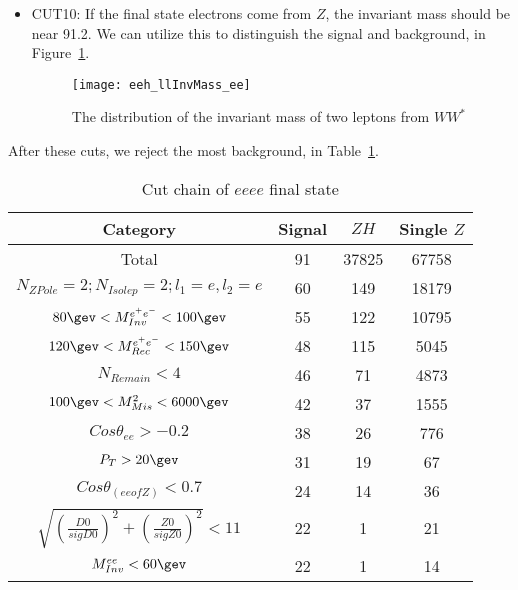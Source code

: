 \documentclass[11pt,a4paper]{cepcnote}
\begin{document}
\begin{itemize}
\item CUT10: If the final state electrons come from $Z$, the invariant mass should be near 91.2\gev.
We can utilize this to distinguish the signal and background, in Figure~\ref{fig:llInvMass}.
\begin{figure}[H]
\centering
\texttt{[image: eeh\_llInvMass\_ee]}
\caption[Invariant Mass of two electrons]{The distribution of the invariant mass of two leptons from $WW^*$}
\label{fig:llInvMass}
\end{figure}

\end{itemize}

After these cuts, we reject the most background, in Table~\ref{tab:eeCutchain}.
\begin{table}[H]
  \begin{center}
    \begin{tabular}{cccc}
      \hline \hline
      \multicolumn{1}{c}{Category}      & \multicolumn{1}{c}{Signal}&\multicolumn{1}{c}{$ZH$}&\multicolumn{1}{c}{Single $Z$}\\ 
      \hline
      Total		       	 									&      91  	& 37825	&  67758\\
      $N_{ZPole}=2; N_{Isolep}=2; l_1 = e, l_2 = e$	 		&     60    &   149	& 18179\\
      $80\gev < M_{Inv}^{e^+e^-} < 100\gev$         		&     55    &   122	& 	10795\\
	  $120\gev < M_{Rec}^{e^+e^-} < 150\gev$        		&     48    &   115	& 	5045\\
	  $N_{Remain} < 4$										&	  46	&	71	& 	4873\\
	  $100\gev < M_{Mis}^{2} < 6000\gev$		        	&     42    &   37  & 	1555\\
	  $Cos\theta_{ee} > -0.2$			        			&     38    &   26	& 	776\\
	  $P_{T} > 20\gev$										&	  31	&	19	& 	67\\
	  $Cos\theta_{(ee of Z)} < 0.7$							&     24    &   14  &   36\\
	  $\sqrt{(\frac{D0}{sigD0})^2+(\frac{Z0}{sigZ0})^2} < 11$&    22    &   1   &   21\\
	  $M_{Inv}^{ee} < 60\gev$								&     22    &   1   &   14\\
      \hline \hline
    \end{tabular}
   \caption[Monte Carlo purities in the single lepton sample]{Cut chain of $ee ee$ final state}
  \label{tab:eeCutchain}
 \end{center}
\end{table}
\end{document}

